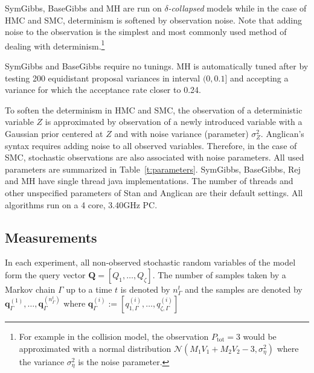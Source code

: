 \documentclass[]{article}
\newcommand{\bvec}[1]{\textbf{#1}}
\begin{document}
SymGibbs, BaseGibbs and MH are run on \emph{$\delta$-collapsed} models while in the case of HMC and SMC, determinism is softened by observation noise. %
Note that adding noise to the observation is the simplest and most commonly used method of dealing with determinism\citep{patil2010pymc}.\footnote{
For example in the collision model, the observation $P_{\text{tot}} = 3$  would be 
approximated with a normal distribution
{\footnotesize $\mathcal{N}( M_1 V_1 + M_2 V_2 - 3, \sigma_\eta^2)$}  
where the variance $\sigma_\eta^2$ is the noise parameter.
}

SymGibbs and BaseGibbs require no tunings. 
MH is automatically tuned after \citep{roberts1997weak} by testing 200 equidistant proposal variances in interval 
$(0, 0.1]$ and accepting a variance for which the acceptance rate closer to 0.24.

To soften the determinism in HMC and SMC,
the observation of a deterministic variable $Z$ %
is approximated by observation of a newly introduced variable 
with a Gaussian prior centered at $Z$ and with noise variance (parameter) $\sigma^2_{Z}$. 
Anglican's syntax requires %
adding noise to all observed variables. Therefore, in the case of SMC, stochastic observations are also associated with noise parameters.
All used parameters are summarized in Table~\ref{t:parameters}. 
SymGibbs, BaseGibbs, Rej and MH have single thread java implementations.
The number of threads and other unspecified parameters of Stan and Anglican are their default settings.   
All algorithms run on a 4 core, 3.40GHz PC.%

\subsection{Measurements}
\label{sect:experimental.results.measures}
In each experiment, all non-observed stochastic random variables of the model  form the query vector $\bvec{Q} = [Q_1, \ldots, Q_\zeta]$.
The number of samples taken by a Markov chain $\Gamma$ up to a time $t$ is denoted by $n_{\Gamma}^t$ and  
the samples are denoted by 
$\bvec{q}_\Gamma^{(1)}, \ldots, \bvec{q}^{(n_{\Gamma}^t)}_\Gamma$
where $\bvec{q}_\Gamma^{(i)} := 
[q_{1, \Gamma}^{(i)} , \ldots, q_{\zeta, \Gamma}^{(i)}]$
\end{document}
